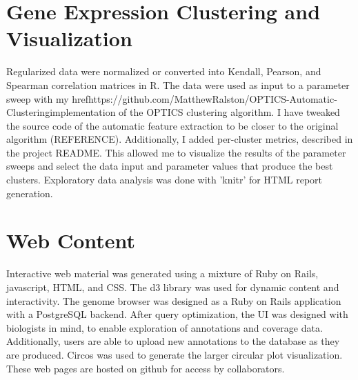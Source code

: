 \section{Gene Expression Clustering and Visualization}
Regularized data were normalized or converted into Kendall, Pearson, and Spearman correlation matrices in R. The data were used as input to a parameter sweep with my href{https://github.com/MatthewRalston/OPTICS-Automatic-Clustering}{implementation} of the OPTICS clustering algorithm. I have tweaked the source code of the automatic feature extraction to be closer to the original algorithm (REFERENCE). Additionally, I added per-cluster metrics, described in the project README. This allowed me to visualize the results of the parameter sweeps and select the data input and parameter values that produce the best clusters. Exploratory data analysis was done with 'knitr' for HTML report generation.

\section{Web Content}
Interactive web material was generated using a mixture of Ruby on Rails, javascript, HTML, and CSS. The d3 library was used for dynamic content and interactivity. The genome browser was designed as a Ruby on Rails application with a PostgreSQL backend. After query optimization, the UI was designed with biologists in mind, to enable exploration of annotations and coverage data. Additionally, users are able to upload new annotations to the database as they are produced. Circos was used to generate the larger circular plot visualization. These web pages are hosted on github for access by collaborators.


